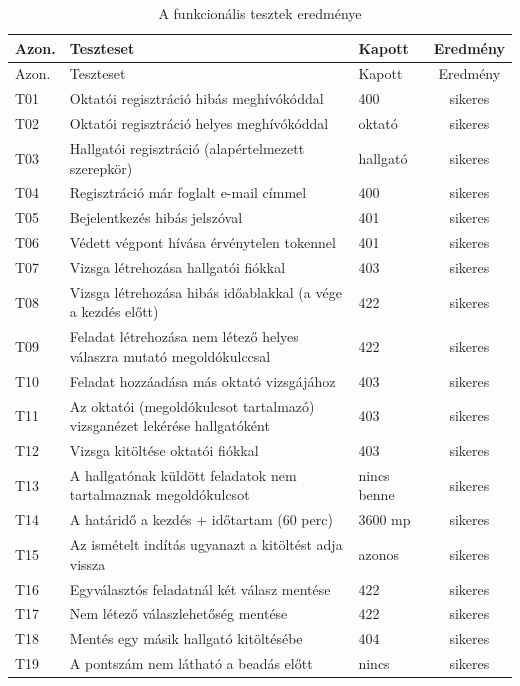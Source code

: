 {\small
\begin{longtable}{@{}lp{9.2cm}p{2.0cm}c@{}}
  \caption{A funkcionális tesztek eredménye}\label{tab:funkcionalis_tesztek}\\
  \toprule
  Azon. & Teszteset & Kapott & Eredmény \\
  \midrule
  \endfirsthead
  \toprule
  Azon. & Teszteset & Kapott & Eredmény \\
  \midrule
  \endhead
  \bottomrule
  \endfoot
  T01 & Oktatói regisztráció hibás meghívókóddal & 400 & sikeres \\
  T02 & Oktatói regisztráció helyes meghívókóddal & oktató & sikeres \\
  T03 & Hallgatói regisztráció (alapértelmezett szerepkör) & hallgató & sikeres \\
  T04 & Regisztráció már foglalt e-mail címmel & 400 & sikeres \\
  T05 & Bejelentkezés hibás jelszóval & 401 & sikeres \\
  T06 & Védett végpont hívása érvénytelen tokennel & 401 & sikeres \\
  T07 & Vizsga létrehozása hallgatói fiókkal & 403 & sikeres \\
  T08 & Vizsga létrehozása hibás időablakkal (a vége a kezdés előtt) & 422 & sikeres \\
  T09 & Feladat létrehozása nem létező helyes válaszra mutató megoldókulccsal & 422 & sikeres \\
  T10 & Feladat hozzáadása más oktató vizsgájához & 403 & sikeres \\
  T11 & Az oktatói (megoldókulcsot tartalmazó) vizsganézet lekérése hallgatóként & 403 & sikeres \\
  T12 & Vizsga kitöltése oktatói fiókkal & 403 & sikeres \\
  T13 & A hallgatónak küldött feladatok nem tartalmaznak megoldókulcsot & nincs benne & sikeres \\
  T14 & A határidő a kezdés + időtartam (60 perc) & 3600 mp & sikeres \\
  T15 & Az ismételt indítás ugyanazt a kitöltést adja vissza & azonos & sikeres \\
  T16 & Egyválasztós feladatnál két válasz mentése & 422 & sikeres \\
  T17 & Nem létező válaszlehetőség mentése & 422 & sikeres \\
  T18 & Mentés egy másik hallgató kitöltésébe & 404 & sikeres \\
  T19 & A pontszám nem látható a beadás előtt & nincs & sikeres \\

\end{longtable}}

